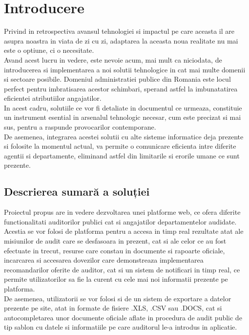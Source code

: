 \chapter*{Introducere} 
Privind in retrospectiva avansul tehnologiei si impactul pe care aceasta il are asupra noastra in viata de zi cu zi, adaptarea la aceasta noua realitate nu mai este o optiune, ci o necesitate.\\
Avand acest lucru in vedere, este nevoie acum, mai mult ca niciodata, de introducerea si implementarea a noi solutii tehnologice in cat mai multe domenii si sectoare posibile. Domeniul administratiei publice din Romania este locul perfect pentru imbratisarea acestor schimbari, sperand astfel la imbunatatirea eficientei atributiilor angajatilor.\\
In acest cadru, solutiile ce vor fi detaliate in documentul ce urmeaza, constituie un instrument esential 
in arsenalul tehnologic necesar, cum este precizat si mai sus, pentru a raspunde provocarilor contemporane.\\
De asemenea, integrarea acestei solutii cu alte sisteme informatice deja prezente si folosite la momentul actual, va permite o comunicare eficienta intre diferite agentii si departamente, eliminand astfel din limitarile si erorile umane ce sunt prezente.
\section*{Descrierea sumară a soluției}
Proiectul propus are in vedere dezvoltarea unei platforme web, ce ofera diferite functionalitati auditorilor publici cat si angajatilor departamentelor audidate. Acestia se vor folosi de platforma pentru a accesa in timp real rezultate atat ale misiunilor de audit care se desfasoara in prezent, cat si ale celor ce au fost efectuate in trecut, resurse care constau in documente si rapoarte oficiale, 
incarcarea si accesarea dovezilor care demonstreaza implementarea recomandarilor oferite de auditor, cat si un sistem de notificari in timp real, ce permite utilizatorilor sa fie la curent cu cele mai noi informatii prezente pe platforma.\\
De asemenea, utilizatorii se vor folosi si de un sistem de exportare a datelor prezente pe site, atat in formate de fisiere .XLS, .CSV sau .DOCS, cat si autocompletarea unor documente oficiale aflate in procedura de audit public de tip sablon cu datele si informatiile pe care auditorul le-a introdus in aplicatie.
